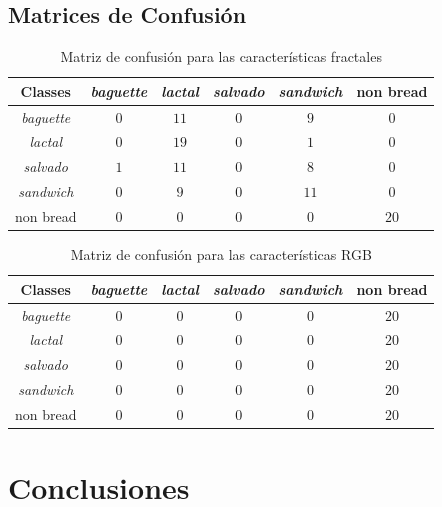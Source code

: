 \documentclass{beamer}
\begin{document}
\subsection{Matrices de Confusi\'on}
\begin{frame}
\begin{small}
\begin{table}[htb]
\centering
\begin{tabular}{|c|c|c|c|c|c|}
    \hline
    Classes & {\em baguette} & {\em lactal} & {\em salvado} & {\em sandwich} & non bread\\
    \hline
    \hline
    {\em baguette}  & $0$ & $11$ & $0$ & $9$  & $0$\\
    \hline
    {\em lactal}    & $0$ & $19$ & $0$ & $1$  & $0$\\
    \hline
    {\em salvado}   & $1$ & $11$ & $0$ & $8$  & $0$\\
    \hline
    {\em sandwich}  & $0$ & $9$  & $0$ & $11$ & $0$\\
    \hline
    non bread       & $0$ & $0$  & $0$ & $0$  & $20$\\
    \hline
\end{tabular}
\caption{Matriz de confusi\'on para las caracter\'isticas fractales}
\label{table:ConfusionMatrixFractal}
\end{table}

\begin{table}[htb]
\centering
\begin{tabular}{|c|c|c|c|c|c|}
    \hline
    Classes & {\em baguette} & {\em lactal} & {\em salvado} & {\em sandwich} & non bread\\
    \hline
    \hline
    {\em baguette}  & $0$ & $0$ & $0$ & $0$ & $20$\\
    \hline
    {\em lactal}    & $0$ & $0$ & $0$ & $0$ & $20$\\
    \hline
    {\em salvado}   & $0$ & $0$ & $0$ & $0$ & $20$\\
    \hline
    {\em sandwich}  & $0$ & $0$ & $0$ & $0$ & $20$\\
    \hline
    non bread       & $0$ & $0$ & $0$ & $0$ & $20$\\
    \hline
\end{tabular}
\caption{Matriz de confusi\'on para las caracter\'isticas RGB}
\label{table:ConfusionMatrixNonFractal}
\end{table}
\end{small}
\end{frame}

\section{Conclusiones}
\end{document}
